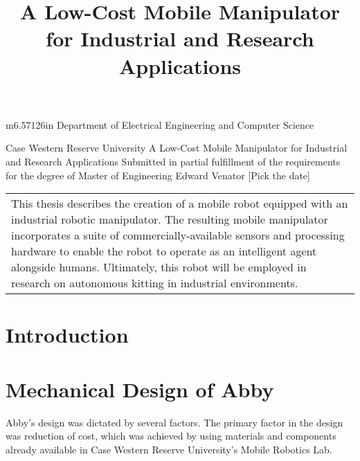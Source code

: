 \documentclass{article}
\title{A Low-Cost Mobile Manipulator for Industrial and Research Applications}
\makeatletter
\newcommand\arraybslash{\let\\\@arraycr}
\makeatother
\begin{document}
\begin{center}
\tablehead{}
\begin{supertabular}{m{6.57126in}}
\centering Department of Electrical Engineering and Computer Science \par

\centering\arraybslash Case Western Reserve University\\
\centering\arraybslash A Low-Cost Mobile Manipulator for Industrial and Research Applications\\\hline
\centering\arraybslash Submitted in partial fulfillment of the requirements for the degree of Master of Engineering\\
\\
\centering\arraybslash Edward Venator\\
\centering\arraybslash [Pick the date]\\
\end{supertabular}
\end{center}
\begin{flushleft}
\tablehead{}
\begin{supertabular}{m{6.57126in}}
This thesis describes the creation of a mobile robot equipped with an industrial robotic manipulator. The resulting mobile manipulator incorporates a suite of commercially-available sensors and processing hardware to enable the robot to operate as an intelligent agent alongside humans. Ultimately, this robot will be employed in research on autonomous kitting in industrial environments.\\
\end{supertabular}
\end{flushleft}
\setcounter{tocdepth}{10}
\renewcommand\contentsname{}
\tableofcontents
\section[]{}
\clearpage\section[Introduction]{Introduction}
\section[Mechanical Design of Abby]{Mechanical Design of Abby}
Abby{\textquoteright}s design was dictated by several factors. The primary factor in the design was reduction of cost, which was achieved by using materials and components already available in Case Western Reserve University{\textquoteright}s Mobile Robotics Lab.
\end{document}
